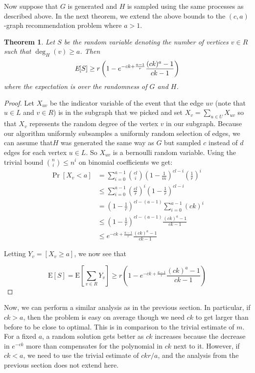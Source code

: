 \documentclass[11pt]{article}
\newcommand{\E}{\text{E}}
\newtheorem{thm}{Theorem}
\begin{document}
Now suppose that $G$ is generated and $H$ is sampled using the same
processes as described above. In the next theorem, we extend the above
bounds to the $(c,a)$-graph recommendation problem where $a>1$. 

\begin{thm}
Let $S$ be the random variable denoting the number of vertices $v \in R$ such that $\deg_{H}(v)\geq a$. Then
\[ \emph{\E}[S] \geq r\left(1-e^{-ck+\frac{a-1}{r}}\frac{(ck)^a-1}{ck-1}\right)  \]
where the expectation is over the randomness of $G$ and $H$.
\end{thm}

\begin{proof}
Let $X_{uv}$ be the indicator variable of the event that the edge $uv$
(note that $u\in L$ and $v\in R$) is in the subgraph that we picked
and set $X_{v} = \sum_{u\in U} X_{uv}$ so that $X_{v}$ represents the
random degree of the vertex $v$ in our subgraph. Because our algorithm
uniformly subsamples a uniformly random selection of edges, we can
assume that$H$ was generated the same way as $G$ but sampled $c$
instead of $d$ edges for each vertex $u\in L$. So $X_{uv}$ is a
bernoulli random variable. Using the trivial bound $\binom{n}{i}
\leq n^i$ on binomial coefficients we get:
\begin{align*}
      \Pr[X_v < a]
&=    \sum_{i=0}^{a-1} \binom{cl}{i} \left(1-\frac{1}{m}\right)^{cl-i}\left(\frac{1}{r}\right)^i \\
&\leq \sum_{i=0}^{a-1} \left(\frac{cl}{r}\right)^i\left(1-\frac{1}{r}\right)^{cl-i} \\
&=    \left(1-\frac{1}{r}\right)^{cl-(a-1)}\sum_{i=0}^{a-1} (ck)^i \\
&\leq \left(1-\frac{1}{r}\right)^{cl-(a-1)}\frac{(ck)^a-1}{ck-1} \\
&\leq e^{-ck+\frac{a-1}{r}} \frac{(ck)^a-1}{ck-1}
\end{align*}


Letting $Y_v = \left[X_v \geq a\right]$, we now see that

\[ \E[S] = \E\left[\sum_{v\in R} Y_v\right] \geq r\left(1-e^{-ck+\frac{a-1}{r}} \frac{(ck)^a-1}{ck-1}\right) \]
\end{proof}

Now, we can perform a similar analysis as in the previous section. In
particular, if $ck>a$, then the problem is easy on average though we
need $ck$ to get larger than before to be close to optimal. This
is in comparison to the trivial estimate of $m$. For a fixed $a$, a
random solution gets better as $ck$ increases because the decrease in
$e^{-ck}$ more than compensates for the polynomial in $ck$ next to
it. However, if $ck<a$, we need to use the trivial estimate of
$ckr/a$, and the analysis from the previous section does not extend
here. \\
\end{document}
